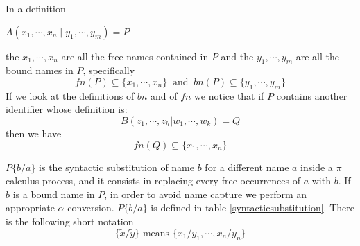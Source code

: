 In a definition
\begin{center}
   $A(x_{1}, \cdots, x_{n}\; | \;y_{1}, \cdots, y_{m})=P$
\end{center}
the $x_{1}, \cdots, x_{n}$ are all the free names contained in $P$ and the $y_{1}, \cdots, y_{m}$ are all the bound names in $P$, specifically 
\[
  fn(P) \subseteq\{x_{1}, \cdots, x_{n}\}
  \;\;\mbox{and}\;\;
  bn(P) \subseteq\{y_{1}, \cdots, y_{m}\}
\]
If we look at the definitions of $bn$ and of $fn$ we notice that if $P$ contains another identifier whose definition is:
\[
  B(z_{1},\cdots, z_{h}|w_{1},\cdots, w_{k})=Q
\] 
then we have 
\[
  fn(Q)\subseteq\{x_{1}, \cdots, x_{n}\}
\]




\begin{definition}
  $P\{b/a\}$ is the syntactic substitution of name $b$ for a different name $a$ inside a $\pi$ calculus process, and it consists in replacing every free occurrences of $a$ with $b$. If $b$ is a bound name in $P$, in order to avoid name capture we perform an appropriate $\alpha$ conversion. $P\{b/a\}$ is defined in table \ref{syntacticsubstitution}. There is the following short notation
  \[
    \{\tilde{x}/\tilde{y}\}\mbox{ means } \{x_{1}/y_{1}, \cdots, x_{n}/y_{n}\}
  \]
\end{definition}

